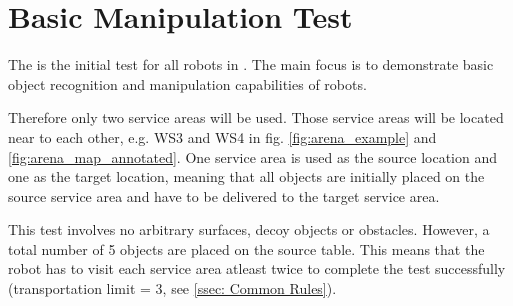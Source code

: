 

\section{Basic Manipulation Test}
\label{sec:Basic Manipulation Test}

The  is the initial test for all robots in \RCAW .
The main focus is to demonstrate basic object recognition and manipulation capabilities of robots.

Therefore only two service areas will be used. Those service areas will be located near to each other, e.g. WS3 and WS4 in fig. \ref{fig:arena_example} and \ref{fig:arena_map_annotated}. One service area is used as the source location and one as the target location, meaning that all objects are initially placed on the source service area and have to be delivered to the target service area.

This test involves no arbitrary surfaces, decoy objects or obstacles.
However, a total number of 5 objects are placed on the source table.
This means that the robot has to visit each service area atleast twice to complete the test successfully (transportation limit = 3, see \ref{ssec: Common Rules}).


